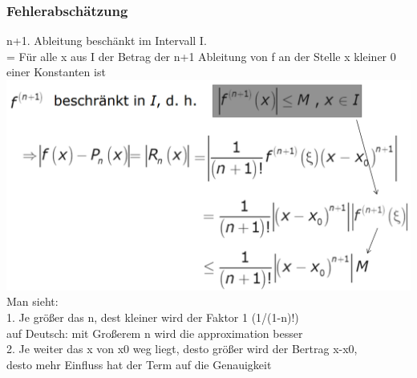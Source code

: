 \documentclass[12pt,a4paper]{article}
\begin{document}
\subsubsection{Fehlerabschätzung}
n+1. Ableitung beschänkt im Intervall I.\\
= Für alle x aus I der Betrag der n+1 Ableitung von f an der Stelle x kleiner 0 einer Konstanten ist\\
\includegraphics[width=1\textwidth]{Bilder/V1/9.png}\\
Man sieht:\\
1. Je größer das n, dest kleiner wird der Faktor 1 (1/(1-n)!)\\
auf Deutsch: mit Großerem n wird die approximation besser\\
2. Je weiter das x von x0 weg liegt, desto größer wird der Bertrag x-x0, \\
desto mehr Einfluss hat der Term auf die Genauigkeit\\
\end{document}
